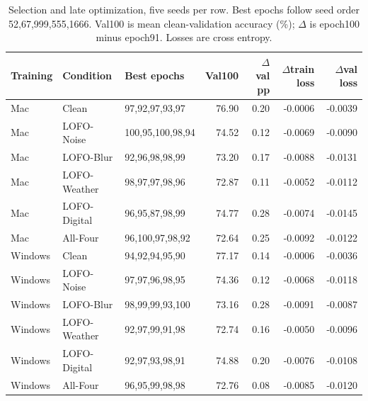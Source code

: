 \begin{table}[!htbp]
\centering
\small
\setlength{\tabcolsep}{5pt}
\caption{Selection and late optimization, five seeds per row. Best epochs follow seed order 52,67,999,555,1666. Val100 is mean clean-validation accuracy (\%); $\Delta$ is epoch100 minus epoch91. Losses are cross entropy.}
\label{tab:convergence}
\begin{tabular}{lllr rrr}
\toprule
Training & Condition & Best epochs & Val100 & $\Delta$val pp & $\Delta$train loss & $\Delta$val loss \\
\midrule
Mac & Clean & 97,92,97,93,97 & 76.90 & 0.20 & -0.0006 & -0.0039 \\
Mac & LOFO-Noise & 100,95,100,98,94 & 74.52 & 0.12 & -0.0069 & -0.0090 \\
Mac & LOFO-Blur & 92,96,98,98,99 & 73.20 & 0.17 & -0.0088 & -0.0131 \\
Mac & LOFO-Weather & 98,97,97,98,96 & 72.87 & 0.11 & -0.0052 & -0.0112 \\
Mac & LOFO-Digital & 96,95,87,98,99 & 74.77 & 0.28 & -0.0074 & -0.0145 \\
Mac & All-Four & 96,100,97,98,92 & 72.64 & 0.25 & -0.0092 & -0.0122 \\
Windows & Clean & 94,92,94,95,90 & 77.17 & 0.14 & -0.0006 & -0.0036 \\
Windows & LOFO-Noise & 97,97,96,98,95 & 74.36 & 0.12 & -0.0068 & -0.0118 \\
Windows & LOFO-Blur & 98,99,99,93,100 & 73.16 & 0.28 & -0.0091 & -0.0087 \\
Windows & LOFO-Weather & 92,97,99,91,98 & 72.74 & 0.16 & -0.0050 & -0.0096 \\
Windows & LOFO-Digital & 92,97,93,98,91 & 74.88 & 0.20 & -0.0076 & -0.0108 \\
Windows & All-Four & 96,95,99,98,98 & 72.76 & 0.08 & -0.0085 & -0.0120 \\
\bottomrule
\end{tabular}
\end{table}
